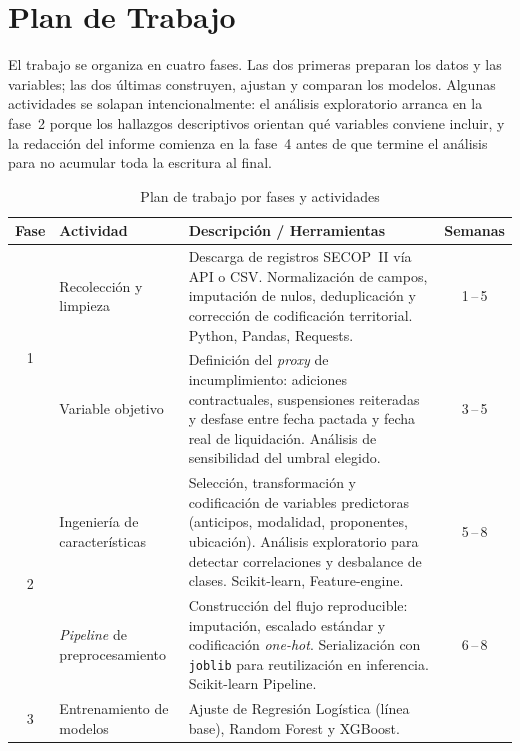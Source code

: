 \section{Plan de Trabajo}

El trabajo se organiza en cuatro fases. Las dos primeras preparan los datos y
las variables; las dos últimas construyen, ajustan y comparan los modelos. Algunas
actividades se solapan intencionalmente: el análisis exploratorio arranca en la
fase~2 porque los hallazgos descriptivos orientan qué variables conviene incluir,
y la redacción del informe comienza en la fase~4 antes de que termine el análisis
para no acumular toda la escritura al final.

\begin{table}[H]
  \centering
  \caption{Plan de trabajo por fases y actividades}
  \label{tab:plan}
  \renewcommand{\arraystretch}{1.35}
  \begin{tabularx}{\linewidth}{c l X c}
    \toprule
    \textbf{Fase} & \textbf{Actividad} & \textbf{Descripción / Herramientas} & \textbf{Semanas} \\
    \midrule
    \multirow{2}{*}{1}
      & Recolección y limpieza
      & Descarga de registros SECOP~II vía API o CSV. Normalización de campos,
        imputación de nulos, deduplicación y corrección de codificación territorial.
        Python, Pandas, Requests.
      & 1\,--\,5 \\
      & Variable objetivo
      & Definición del \textit{proxy} de incumplimiento: adiciones contractuales,
        suspensiones reiteradas y desfase entre fecha pactada y fecha real de
        liquidación. Análisis de sensibilidad del umbral elegido.
      & 3\,--\,5 \\
    \midrule
    \multirow{2}{*}{2}
      & Ingeniería de características
      & Selección, transformación y codificación de variables predictoras (anticipos,
        modalidad, proponentes, ubicación). Análisis exploratorio para detectar
        correlaciones y desbalance de clases. Scikit-learn, Feature-engine.
      & 5\,--\,8 \\
      & \textit{Pipeline} de preprocesamiento
      & Construcción del flujo reproducible: imputación, escalado estándar y
        codificación \textit{one-hot}. Serialización con \texttt{joblib} para
        reutilización en inferencia. Scikit-learn Pipeline.
      & 6\,--\,8 \\
    \midrule
    \multirow{2}{*}{3}
      & Entrenamiento de modelos
      & Ajuste de Regresión Logística (línea base), Random Forest y XGBoost.

\end{tabularx}
\end{table}

